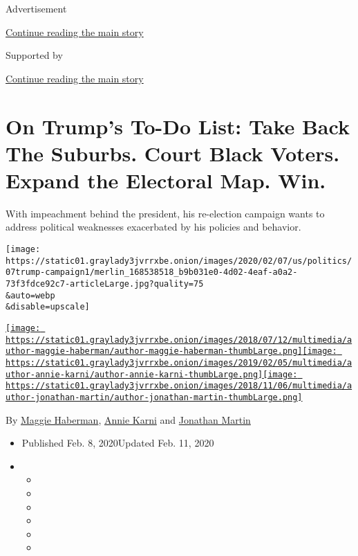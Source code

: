 Advertisement

\protect\hyperlink{after-top}{Continue reading the main story}

Supported by

\protect\hyperlink{after-sponsor}{Continue reading the main story}

\hypertarget{on-trumps-to-do-list-take-back-the-suburbs-court-black-voters-expand-the-electoral-map-win}{%
\section{On Trump's To-Do List: Take Back The Suburbs. Court Black
Voters. Expand the Electoral Map.
Win.}\label{on-trumps-to-do-list-take-back-the-suburbs-court-black-voters-expand-the-electoral-map-win}}

With impeachment behind the president, his re-election campaign wants to
address political weaknesses exacerbated by his policies and behavior.

\texttt{[image: https://static01.graylady3jvrrxbe.onion/images/2020/02/07/us/politics/07trump-campaign1/merlin\_168538518\_b9b031e0-4d02-4eaf-a0a2-73f3fdce92c7-articleLarge.jpg?quality=75\\\&auto=webp\\\&disable=upscale]}

\href{https://www.nytimes3xbfgragh.onion/by/maggie-haberman}{\texttt{[image: https://static01.graylady3jvrrxbe.onion/images/2018/07/12/multimedia/author-maggie-haberman/author-maggie-haberman-thumbLarge.png]}}\href{https://www.nytimes3xbfgragh.onion/by/annie-karni}{\texttt{[image: https://static01.graylady3jvrrxbe.onion/images/2019/02/05/multimedia/author-annie-karni/author-annie-karni-thumbLarge.png]}}\href{https://www.nytimes3xbfgragh.onion/by/jonathan-martin}{\texttt{[image: https://static01.graylady3jvrrxbe.onion/images/2018/11/06/multimedia/author-jonathan-martin/author-jonathan-martin-thumbLarge.png]}}

By \href{https://www.nytimes3xbfgragh.onion/by/maggie-haberman}{Maggie
Haberman},
\href{https://www.nytimes3xbfgragh.onion/by/annie-karni}{Annie Karni}
and
\href{https://www.nytimes3xbfgragh.onion/by/jonathan-martin}{Jonathan
Martin}

\begin{itemize}
\item
  Published Feb. 8, 2020Updated Feb. 11, 2020
\item
  \begin{itemize}
  \item
  \item
  \item
  \item
  \item
  \item
  \end{itemize}
\end{itemize}

